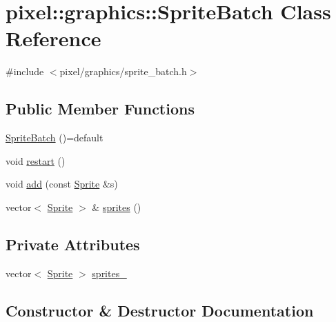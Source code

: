 \hypertarget{classpixel_1_1graphics_1_1_sprite_batch}{}\section{pixel\+:\+:graphics\+:\+:Sprite\+Batch Class Reference}
\label{classpixel_1_1graphics_1_1_sprite_batch}


{\ttfamily \#include $<$pixel/graphics/sprite\+\_\+batch.\+h$>$}

\subsection*{Public Member Functions}
\begin{DoxyCompactItemize}
\item 
\hyperlink{classpixel_1_1graphics_1_1_sprite_batch_addb06c7e22704e142d2796814a70d2d1}{Sprite\+Batch} ()=default
\item 
void \hyperlink{classpixel_1_1graphics_1_1_sprite_batch_a6c868cee20f62769c0d1130af15e9e16}{restart} ()
\item 
void \hyperlink{classpixel_1_1graphics_1_1_sprite_batch_a34bf58e8871e04558af0e780140ee8fa}{add} (const \hyperlink{classpixel_1_1graphics_1_1_sprite}{Sprite} \&s)
\item 
vector$<$ \hyperlink{classpixel_1_1graphics_1_1_sprite}{Sprite} $>$ \& \hyperlink{classpixel_1_1graphics_1_1_sprite_batch_ae25bfb31697a2f4dd80b1d71a4587d89}{sprites} ()
\end{DoxyCompactItemize}
\subsection*{Private Attributes}
\begin{DoxyCompactItemize}
\item 
vector$<$ \hyperlink{classpixel_1_1graphics_1_1_sprite}{Sprite} $>$ \hyperlink{classpixel_1_1graphics_1_1_sprite_batch_a46d82e006276b2bd2061dd12d5d14f91}{sprites\+\_\+}
\end{DoxyCompactItemize}


\subsection{Constructor \& Destructor Documentation}
\mbox{\label{classpixel_1_1graphics_1_1_sprite_batch_addb06c7e22704e142d2796814a70d2d1}} 
